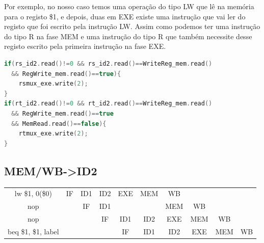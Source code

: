 \documentclass[pdftex,12pt,a4paper]{report}
\begin{document}
Por exemplo, no nosso caso temos uma operação do tipo LW que lê na memória para o registo \$1, e depois, duas em EXE existe uma instrução que vai ler do registo que foi escrito pela instrução LW. Assim como podemos ter uma instrução do tipo R na fase MEM e uma instrução do tipo R que também necessite desse registo escrito pela primeira instrução na fase EXE. 

\begin{lstlisting}[language=c]
if(rs_id2.read()!=0 && rs_id2.read()==WriteReg_mem.read()
  && RegWrite_mem.read()==true){
    rsmux_exe.write(2);
}
if(rt_id2.read()!=0 && rt_id2.read()==WriteReg_mem.read() 
  && RegWrite_mem.read()==true 
  && MemRead.read()==false){
    rtmux_exe.write(2);
}
\end{lstlisting} 

\subsection{MEM/WB->ID2}

\begin{table}[!htb]
\centering
\label{my-label}
\begin{tabular}{cccc|c|c|c|ccl}
\cline{2-7}
\multicolumn{1}{c|}{lw \$1, 0(\$0)}     & \multicolumn{1}{c|}{IF} & \multicolumn{1}{c|}{ID1} & ID2                   & EXE                                                & \cellcolor[HTML]{F8A102}MEM                        & \cellcolor[HTML]{FFCC67}WB  &                          &                          &                         \\ \cline{2-8}
nop                                   & \multicolumn{1}{c|}{}   & \multicolumn{1}{c|}{IF}  & ID1                   & \cellcolor[HTML]{FFFFFF}{\color[HTML]{000000} ID2} & \cellcolor[HTML]{FFFFFF}{\color[HTML]{333333} EXE} & MEM                         & \multicolumn{1}{c|}{WB}  &                          &                         \\ \cline{3-9}
nop                                   &                         & \multicolumn{1}{c|}{}    & IF                    & ID1                                                & ID2                                                & EXE                         & \multicolumn{1}{c|}{MEM} & \multicolumn{1}{c|}{WB}  &                         \\ \cline{4-10} 
\multicolumn{1}{l}{beq \$1, \$1, label} & \multicolumn{1}{l}{}    & \multicolumn{1}{l}{}     & \multicolumn{1}{l|}{} & IF                                                 & ID1                                                & \cellcolor[HTML]{F8A102}ID2 & \multicolumn{1}{c|}{EXE} & \multicolumn{1}{c|}{MEM} & \multicolumn{1}{c|}{WB} \\ \cline{5-10} 
\end{tabular}
\end{table}
\end{document}
